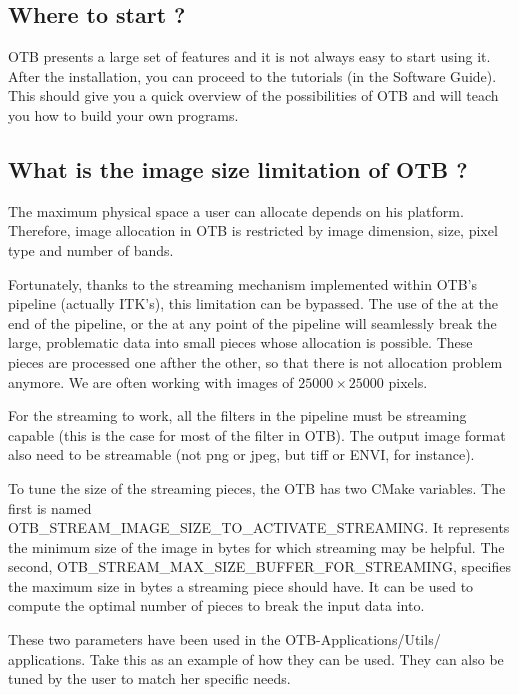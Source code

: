 \subsection{Where to start ?}

OTB presents a large set of features and it is not always easy to start using it.
After the installation, you can proceed to the tutorials (in the Software Guide). 
This should give you a quick overview of the possibilities of OTB and will teach 
you how to build your own programs.

\subsection{What is the image size limitation of OTB ?}

The maximum physical space a user can allocate depends on his platform. Therefore, 
image allocation in OTB is restricted by image dimension, size, pixel type and number 
of bands.

Fortunately, thanks to the streaming mechanism implemented within
OTB's pipeline (actually ITK's), this limitation can be bypassed. The
use of the  at the end of the pipeline,
or the  at any point of the pipeline will
seamlessly break the large, problematic data into small pieces whose
allocation is possible. These pieces are processed one afther the
other, so that there is not allocation problem anymore. We are often working with
images of $25000 \times 25000$ pixels.

For the streaming to work, all the filters in the pipeline must be streaming capable 
(this is the case for most of the filter in OTB). The output image format also need to be 
streamable (not png or jpeg, but tiff or ENVI, for instance).

To tune the size of the streaming pieces, the OTB has
two CMake variables. The first is named
OTB\_STREAM\_IMAGE\_SIZE\_TO\_ACTIVATE\_STREAMING. It represents the
minimum size of the image in bytes for which streaming may be helpful. The
second, OTB\_STREAM\_MAX\_SIZE\_BUFFER\_FOR\_STREAMING, specifies the
maximum size in bytes a streaming piece should have. It can be used to
compute the optimal number of pieces to break the input data into.

These two parameters have been used in the OTB-Applications/Utils/
applications. Take this as an example of how they can be used. They
can also be tuned by the user to match her specific needs.


